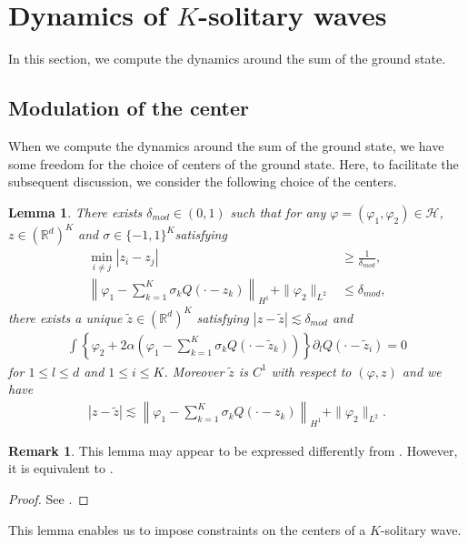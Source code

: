 \documentclass[reqno]{amsart}
\theoremstyle{plain}
\newtheorem{lemma}[theorem]{Lemma}
\theoremstyle{definition}
\newtheorem{remark}{Remark}[section]
\numberwithin{equation}{section}
\newcommand{\1}{\mathbbm{1}}
\begin{document}
\section{Dynamics of $K$-solitary waves}
In this section, we compute the dynamics around the sum of the ground state.

\subsection{Modulation of the center}

When we compute the dynamics around the sum of the ground state, we have some freedom for the choice of centers of the ground state. Here, to facilitate the subsequent discussion, we consider the following choice of the centers.

\begin{lemma}\label{modulation}
There exists $\delta_{mod}\in (0,1)$ such that for any $\varphi=(\varphi_1,\varphi_2) \in \mathcal{H}$,  $z\in (\mathbb{R}^d)^K$ and $\sigma \in \{-1,1\}^K$satisfying
\begin{align*}
\min_{i\neq j} |z_i-z_j|&\geq \frac{1}{\delta_{mod}},
\\
\left\| \varphi_1-\sum_{k=1}^K \sigma_k Q(\cdot-z_k)\right\|_{H^1}+\|\varphi_2\|_{L^2}&\leq \delta_{mod},
\end{align*}
there exists a unique $\tilde{z}\in (\mathbb{R}^d)^K$ satisfying $|z-\tilde{z}|\lesssim \delta_{mod}$ and
\begin{align*}
\int \left\{\varphi_2+2\alpha(\varphi_1-\sum_{k=1}^K \sigma_k Q(\cdot-\tilde{z}_k))\right\} {\partial}_lQ(\cdot-\tilde{z}_i)=0
\end{align*}
for $1\leq l\leq d$ and $1\leq i\leq K$. Moreover $\tilde{z}$ is $C^1$ with respect to $(\varphi,z)$ and we have
\begin{align*}
|z-\tilde{z}|\lesssim \left\| \varphi_1-\sum_{k=1}^K \sigma_k Q(\cdot-z_k)\right\|_{H^1}+\|\varphi_2\|_{L^2}.
\end{align*}
\end{lemma}


\begin{remark}
This lemma may appear to be expressed differently from \cite[Lemma 4.1]{IN}. However, it is equivalent to \cite[Lemma 4.1]{IN}. 
\end{remark}

\begin{proof}
See \cite[Lemma 4.1]{IN}.
\end{proof}


This lemma enables us to impose constraints on the centers of a $K$-solitary wave.
\end{document}
